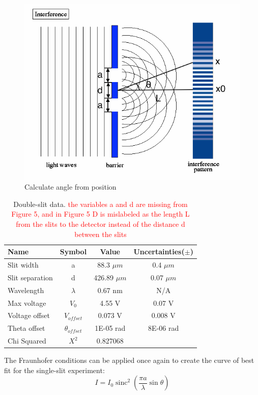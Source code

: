 \documentclass[prb,preprint]{revtex4-1}
\DeclareMathOperator{\sinc}{sinc}
\begin{document}
\begin{figure}[h]
\centering
\includegraphics[width=5in]{interference.png}
\caption{Calculate angle from position \cite{interference}}
\label{interference}
\end{figure}

\begin{table}[h]
\centering
\caption{Double-slit data. \textcolor{red}{the variables a and d are missing from Figure 5, and in Figure 5 D is mislabeled as the length L from the slits to the detector instead of the distance d between the slits}}
\begin{ruledtabular}
\begin{tabular}{ l c c c}
Name & Symbol & Value & Uncertainties($\pm$)\\
\hline
Slit width & a & 88.3 $\mu m$ & 0.4 $\mu m$\\
Slit separation & d & 426.89 $\mu m$ & 0.07 $\mu m$\\
Wavelength & $\lambda$ & 0.67 nm & N/A \\
Max voltage & $V_0$ & 4.55 V & 0.07 V\\
Voltage offset & $V_{offset}$ & 0.073 V & 0.008 V\\
Theta offset &$ \theta_{offset}$ & 1E-05 rad & 8E-06 rad \\
\hline
Chi Squared & $X^2$ & 0.827068&
\end{tabular}
\end{ruledtabular}
\label{data}
\end{table}

\newpage

The Fraunhofer conditions can be applied once again to create  the curve of best fit for the single-slit experiment: 
\begin{equation}
I=I_0 \sinc^2 \left(\frac{\pi a}{\lambda} \sin\theta \right)
\label{eq2}
\end{equation}
\end{document}
